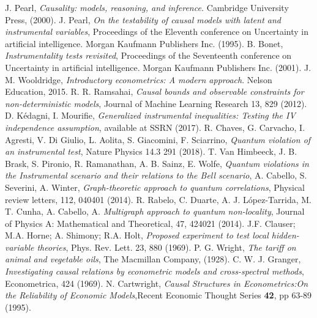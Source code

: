 \documentclass[letterpaper]{article}
\begin{document}
\begin{thebibliography}{}
     J. Pearl, 
        {\em Causality: models, reasoning, and inference.}
        Cambridge University Press, (2000).
     J. Pearl, 
        {\em On the testability of causal models with latent and instrumental variables}, 
        Proceedings of the Eleventh conference on Uncertainty in artificial
        intelligence. Morgan Kaufmann Publishers Inc. (1995).
     B. Bonet, {\em Instrumentality tests revisited},
        Proceedings of the Seventeenth conference on Uncertainty in artificial
        intelligence. Morgan Kaufmann Publishers Inc. (2001).
             J. M. Wooldridge, {\em Introductory econometrics: A modern approach}. Nelson Education, 2015.
        R. R. Ramsahai, {\em Causal bounds and observable constraints for non-deterministic models},
        Journal of Machine Learning Research 13, 829 (2012).
          D. Kédagni, I. Mourifie, {\em Generalized instrumental inequalities: Testing the IV independence assumption}, available at SSRN (2017).
     R. Chaves, G. Carvacho, I. Agresti, V. Di Giulio, L. Aolita,
        S. Giacomini, F. Sciarrino, 
        {\em Quantum violation of an instrumental test}, 
        Nature Physics 14.3 291 (2018).
      T. Van Himbeeck, J. B. Brask, S. Pironio, R. Ramanathan, A. B. Sainz, E. Wolfe, 
        {\em Quantum violations in the Instrumental scenario and their relations to the Bell scenario},
      A. Cabello, S. Severini, A. Winter,
         {\em Graph-theoretic approach to quantum correlations}, 
         Physical review letters, 112, 040401 (2014).
      R. Rabelo, C. Duarte, A. J.  López-Tarrida, M. T. Cunha, A. Cabello, A. 
         {\em Multigraph approach to quantum non-locality},
         Journal of Physics A: Mathematical and Theoretical, 47, 424021
         (2014).
       J.F. Clauser; M.A. Horne; A. Shimony; R.A. Holt, {\em Proposed experiment to test local hidden-variable theories}, Phys. Rev. Lett. 23, 880 (1969).
     P. G. Wright, \emph{The tariff on animal and vegetable oils}, The Macmillan Company, (1928).
     C. W. J. Granger, \emph{Investigating causal relations by econometric models and cross-spectral methods}, Econometrica, 424 (1969).
     N. Cartwright, \emph{Causal Structures in Econometrics:On the Reliability of Economic Models},Recent Economic Thought Series \textbf{42}, pp 63-89 (1995).

\end{thebibliography}
\end{document}
